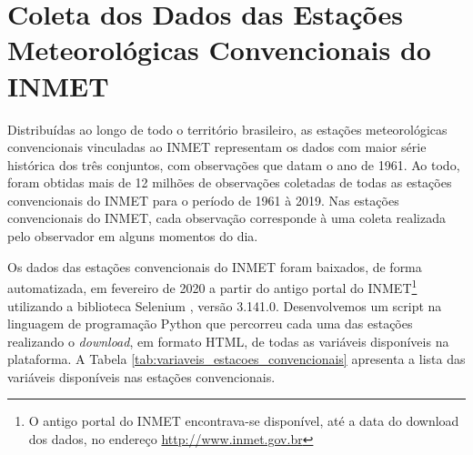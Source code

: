 \section{Coleta dos Dados das Estações Meteorológicas Convencionais do INMET}

Distribuídas ao longo de todo o território brasileiro, as estações meteorológicas convencionais vinculadas ao INMET representam os dados com maior série histórica dos três conjuntos, com observações que datam o ano de 1961. Ao todo, foram obtidas mais de 12 milhões de observações coletadas de todas as estações convencionais do INMET para o período de 1961 à 2019. Nas estações convencionais do INMET, cada observação corresponde à uma coleta realizada pelo observador em alguns momentos do dia. 

Os dados das estações convencionais do INMET foram baixados, de forma automatizada, em fevereiro de 2020 a partir do antigo portal do INMET\footnote{O antigo portal do INMET encontrava-se disponível, até a data do download dos dados, no endereço \href{http://www.inmet.gov.br}{http://www.inmet.gov.br}} utilizando a biblioteca Selenium \cite{salunke2014selenium}, versão 3.141.0. Desenvolvemos um script na linguagem de programação Python que percorreu cada uma das estações realizando o \textit{download}, em formato HTML, de todas as variáveis disponíveis na plataforma. A Tabela \ref{tab:variaveis_estacoes_convencionais} apresenta a lista das variáveis disponíveis nas estações convencionais.

